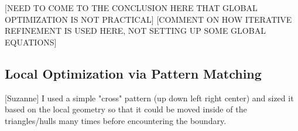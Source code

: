 [NEED TO COME TO THE CONCLUSION HERE THAT GLOBAL OPTIMIZATION IS NOT
PRACTICAL] [COMMENT ON HOW ITERATIVE REFINEMENT IS USED HERE, NOT
SETTING UP SOME GLOBAL EQUATIONS]
\subsection{Local Optimization via Pattern Matching}
[Suzanne] I used a simple "cross" pattern (up down left right center)
and sized it based on the local geometry so that it could be moved
inside of the triangles/hulls many times before encountering the
boundary.

